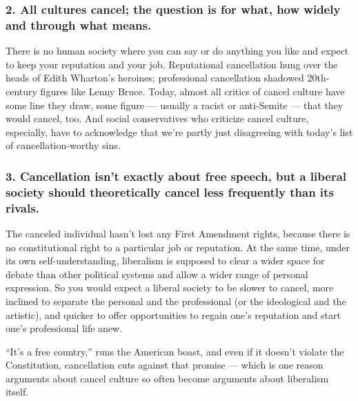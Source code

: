 \hypertarget{2-all-cultures-cancel-the-question-is-for-what-how-widely-and-through-what-means}{%
\subsubsection{2. All cultures cancel; the question is for what, how
widely and through what
means.}\label{2-all-cultures-cancel-the-question-is-for-what-how-widely-and-through-what-means}}

There is no human society where you can say or do anything you like and
expect to keep your reputation and your job. Reputational cancellation
hung over the heads of Edith Wharton's heroines; professional
cancellation shadowed 20th-century figures like Lenny Bruce. Today,
almost all critics of cancel culture have some line they draw, some
figure --- usually a racist or anti-Semite --- that they would cancel,
too. And social conservatives who criticize cancel culture, especially,
have to acknowledge that we're partly just disagreeing with today's list
of cancellation-worthy sins.

\hypertarget{3-cancellation-isnt-exactly-about-free-speech-but-a-liberal-society-should-theoretically-cancel-less-frequently-than-its-rivals}{%
\subsubsection{3. Cancellation isn't exactly about free speech, but a
liberal society should theoretically cancel less frequently than its
rivals.}\label{3-cancellation-isnt-exactly-about-free-speech-but-a-liberal-society-should-theoretically-cancel-less-frequently-than-its-rivals}}

The canceled individual hasn't lost any First Amendment rights, because
there is no constitutional right to a particular job or reputation. At
the same time, under its own self-understanding, liberalism is supposed
to clear a wider space for debate than other political systems and allow
a wider range of personal expression. So you would expect a liberal
society to be slower to cancel, more inclined to separate the personal
and the professional (or the ideological and the artistic), and quicker
to offer opportunities to regain one's reputation and start one's
professional life anew.

``It's a free country,'' runs the American boast, and even if it doesn't
violate the Constitution, cancellation cuts against that promise ---
which is one reason arguments about cancel culture so often become
arguments about liberalism itself.

